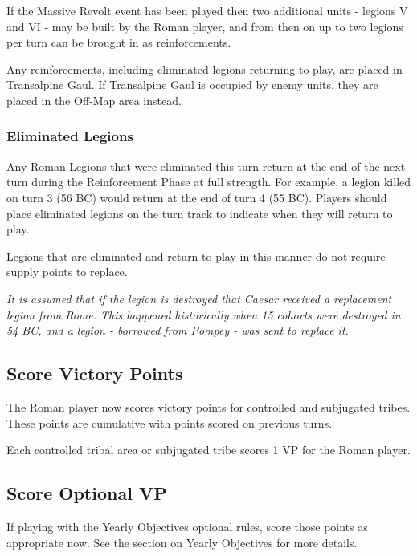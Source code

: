 If the Massive Revolt event has been played then two additional units - legions V and VI - may be built by the Roman player, and from then on up to two legions per turn can be brought in as reinforcements.

Any reinforcements, including eliminated legions returning to play, are placed in Transalpine Gaul. If Transalpine Gaul is occupied by enemy units, they are placed in the Off-Map area instead.

\subsubsection{Eliminated Legions}
\par
Any Roman Legions that were eliminated this turn return at the end of the next turn during the Reinforcement Phase at full strength. For example, a legion killed on turn 3 (56 BC) would return at the end of turn 4 (55 BC). Players should place eliminated legions on the turn track to indicate when they will return to play.

Legions that are eliminated and return to play in this manner do not require supply points to replace.

\textit{It is assumed that if the legion is destroyed that Caesar received a replacement legion from Rome. This happened historically when 15 cohorts were destroyed in 54 BC, and a legion - borrowed from Pompey - was sent to replace it.}

\subsection{Score Victory Points}
\par
The Roman player now scores victory points for controlled and subjugated tribes. These points are cumulative with points scored on previous turns.

Each controlled tribal area or subjugated tribe scores 1 VP for the Roman player.

\subsection{Score Optional VP}
If playing with the Yearly Objectives optional rules, score those points as appropriate now. See the section on Yearly Objectives for more details.